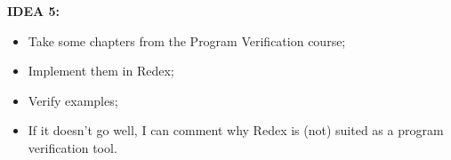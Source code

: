 {  \textbf{IDEA 5:}
  \begin{itemize}
  \item Take some chapters from the Program Verification course;
  \item Implement them in Redex;
  \item Verify examples;
  \item If it doesn't go well, I can comment why Redex is (not) suited as
    a program verification tool.
  \end{itemize}

  
}

